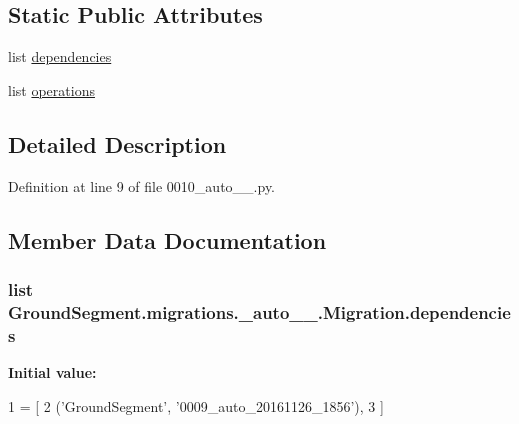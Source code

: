 \subsection*{Static Public Attributes}
\begin{DoxyCompactItemize}
\item 
list \hyperlink{class_ground_segment_1_1migrations_1_10010__auto__20161127__2017_1_1_migration_a23a0a3922e4bea2ea8144c8f8f532720}{dependencies}
\item 
list \hyperlink{class_ground_segment_1_1migrations_1_10010__auto__20161127__2017_1_1_migration_a5c57bed13e9e570d7743139e338fdbb4}{operations}
\end{DoxyCompactItemize}


\subsection{Detailed Description}


Definition at line 9 of file 0010\+\_\+auto\+\_\+\_.\+py.



\subsection{Member Data Documentation}
\hypertarget{class_ground_segment_1_1migrations_1_10010__auto__20161127__2017_1_1_migration_a23a0a3922e4bea2ea8144c8f8f532720}{}
\subsubsection[{dependencies}]{\setlength{\rightskip}{0pt plus 5cm}list Ground\+Segment.\+migrations.\+\_\+auto\+\_\+\_.\+Migration.\+dependencies\hspace{0.3cm}{\ttfamily [static]}}\label{class_ground_segment_1_1migrations_1_10010__auto__20161127__2017_1_1_migration_a23a0a3922e4bea2ea8144c8f8f532720}
{\bfseries Initial value\+:}
\begin{DoxyCode}
1 = [
2         (\textcolor{stringliteral}{'GroundSegment'}, \textcolor{stringliteral}{'0009\_auto\_20161126\_1856'}),
3     ]
\end{DoxyCode}


